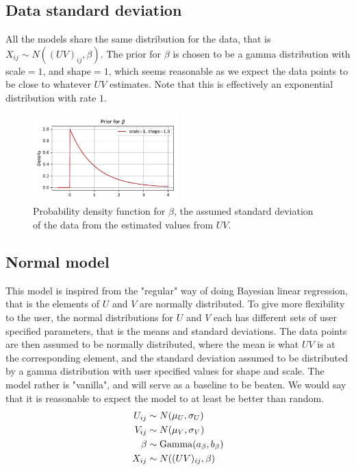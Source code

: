 \documentclass[12pt]{article}
\begin{document}
    \subsection*{Data standard deviation}
        All the models share the same distribution for the data, that is $X_{ij}\sim N((UV)_{ij}, \beta)$. The prior for $\beta$ is chosen to be a gamma distribution with scale$=1$, and shape$=1$, which seems reasonable as we expect the data points to be close to whatever $UV$ estimates. Note that this is effectively an exponential distribution with rate $1$.
    
        \begin{figure}[H]
            \centering
            \includegraphics[width=0.5\textwidth]{betaprior.pdf}
            \caption{Probability density function for $\beta$, the assumed standard deviation of the data from the estimated values from $UV$.}
        \end{figure}
    
    \subsection{Normal model}
    This model is inspired from the "regular" way of doing Bayesian linear regression, that is the elements of $U$ and $V$ are normally distributed. To give more flexibility to the user, the normal distributions for $U$ and $V$ each has different sets of user specified parameters, that is the means and standard deviations. The data points are then assumed to be normally distributed, where the mean is what $UV$ is at the corresponding element, and the standard deviation assumed to be distributed by a gamma distribution with user specified values for shape and scale. The model rather is "vanilla", and will serve as a baseline to be beaten. We would say that it is reasonable to expect the model to at least be better than random.
    \begin{align*}
        U_{ij}  &\sim N(\mu_U, \sigma_U) \\
        V_{ij}  &\sim N(\mu_V, \sigma_V) \\
        \beta  &\sim \operatorname{Gamma}(a_\beta, b_\beta) \\
        X_{ij} &\sim N((UV)_{ij}, \beta) 
    \end{align*}
\end{document}
